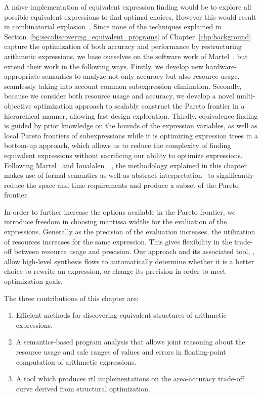 A na{\"\i}ve implementation of equivalent expression finding
would be to explore all possible equivalent expressions to find
optimal choices.  However this would result in combinatorial
explosion~\cite{ioualalen}.  Since none of the techniques explained
in Section~\ref{bg:sec:discovering_equivalent_programs} of
Chapter~\ref{chp:background} capture the optimization of both accuracy and
performance by restructuring arithmetic expressions, we base ourselves on the
software work of Martel~\cite{martel07}, but extend their work in the following
ways. Firstly, we develop new hardware-appropriate semantics to analyze not
only accuracy but also resource usage, seamlessly taking into account common
subexpression elimination. Secondly, because we consider both resource usage
and accuracy, we develop a novel multi-objective optimization approach to
scalably construct the Pareto frontier in a hierarchical manner, allowing fast
design exploration. Thirdly, equivalence finding is guided by prior knowledge
on the bounds of the expression variables, as well as local Pareto frontiers
of subexpressions while it is optimizing expression trees in a bottom-up
approach, which allows us to reduce the complexity of finding equivalent
expressions without sacrificing our ability to optimize expressions.  Following
Martel~\cite{martel07} and Ioualalen~\etal~\cite{ioualalen}, the methodology
explained in this chapter makes use of formal semantics as well as abstract
interpretation~\cite{cousot77} to significantly reduce the space and time
requirements and produce a subset of the Pareto frontier.

In order to further increase the options available in the Pareto frontier,
we introduce freedom in choosing mantissa widths for the evaluation of the
expressions. Generally as the precision of the evaluation increases, the
utilization of resources increases for the same expression. This gives
flexibility in the trade-off between resource usage and precision. Our
approach and its associated tool, \soap, allow high-level synthesis flows to
automatically determine whether it is a better choice to rewrite an expression,
or change its precision in order to meet optimization goals.

The three contributions of this chapter are:
\begin{enumerate}
    \item Efficient methods for discovering equivalent structures of
    arithmetic expressions.
    \item A semantics-based program analysis that allows joint reasoning about
    the resource usage and safe ranges of values and errors in floating-point
    computation of arithmetic expressions.
    \item A tool which produces \gls{rtl} implementations on the area-accuracy
    trade-off curve derived from structural optimization.
\end{enumerate}

